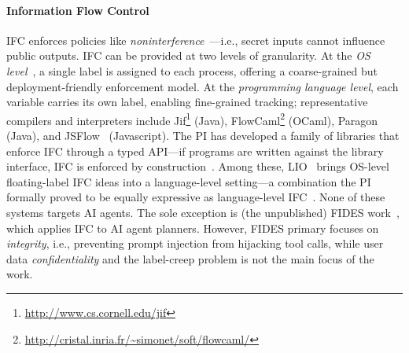 \documentclass{kaw}
\begin{document}
\paragraph{Information Flow Control}
IFC enforces policies like \emph{noninterference}~\cite{Goguen82}---i.e., secret inputs cannot influence public outputs.
%
IFC can be provided at two levels of granularity.
%
At the \emph{OS level}~\cite{BellLaPadula:73,Efstathopoulos:2005,zeldovich:histar}, a single label is assigned to each process, offering a coarse-grained but
deployment-friendly enforcement model.
%
At the \emph{programming language level}, each variable carries its own label, enabling
fine-grained tracking; representative compilers and interpreters include
Jif\footnote{\url{http://www.cs.cornell.edu/jif}} (Java), FlowCaml\footnote{\url{http://cristal.inria.fr/~simonet/soft/flowcaml/}} (OCaml),
Paragon~\cite{conf/aplas/BrobergDS13} (Java), and JSFlow~\cite{JSFlow} (Javascript).
%
The PI has developed a family of libraries that enforce IFC through a
typed API---if programs are written against the library interface, IFC is
enforced by construction~\cite{Russo+:Haskell08,Russo:2015,DBLP:conf/ccs/AlgehedR17}.
%
Among these, LIO~\cite{stefan:lio,stefan:addressing-covert,Stefan:LIO:JFP16}
brings OS-level floating-label IFC ideas into a language-level setting---a
combination the PI formally proved to be equally expressive as 
language-level IFC~\cite{VassenaRGRS19}. 
%
None of these systems targets AI agents.
%
The sole exception is (the unpublished) FIDES work~\cite{Costa:FIDES25}, which
applies IFC to AI agent planners. 
%
However, FIDES primary focuses on \emph{integrity}, i.e., preventing prompt injection from
hijacking tool calls, while user data \emph{confidentiality} and the
label-creep problem is not the main focus of the work. 
\end{document}
